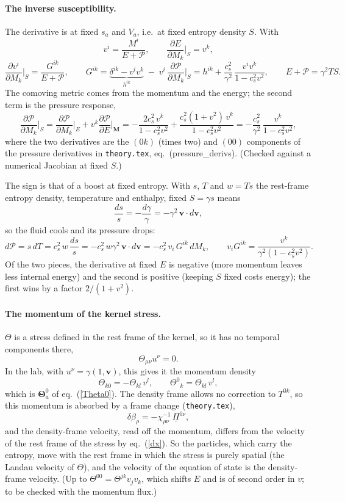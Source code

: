 \documentclass[11pt,aps,preprint,nofootinbib,superscriptaddress,tightenlines]{revtex4-2}
\def\st{\begin{equation}}
\def\stp{\end{equation}}
\def\Eq#1{eq.~(\ref{#1})}
\let\oldparagraph\paragraph
\renewcommand{\paragraph}{\par\bigskip\oldparagraph}
\begin{document}
\paragraph{The inverse susceptibility.}  The derivative is at fixed $s_a$ and $V_a$, i.e.\ at fixed entropy density $S$.  With
\st
v^i=\frac{M^i}{E+\mathcal P},\qquad \frac{\partial E}{\partial M_k}\Big|_S=v^k ,
\stp
\st
\frac{\partial v^i}{\partial M_k}\Big|_S=\frac{G^{ik}}{E+\mathcal P},\qquad
G^{ik}=\underbrace{\delta^{ik}-v^iv^k}_{h^{ik}}\;-\;v^i\,\frac{\partial\mathcal P}{\partial M_k}\Big|_S
=h^{ik}+\frac{c_s^2}{\gamma^2}\,\frac{v^iv^k}{1-c_s^2v^2},\qquad
E+\mathcal P=\gamma^2TS .
\label{G}
\stp
The comoving metric comes from the momentum and the energy; the second term is the pressure response,
\st
\frac{\partial\mathcal P}{\partial M_k}\Big|_S=\frac{\partial\mathcal P}{\partial M_k}\Big|_E+v^k\frac{\partial\mathcal P}{\partial E}\Big|_{\bm M}
=-\frac{2c_s^2\,v^k}{1-c_s^2v^2}+\frac{c_s^2(1+v^2)\,v^k}{1-c_s^2v^2}
=-\frac{c_s^2}{\gamma^2}\,\frac{v^k}{1-c_s^2v^2},
\stp
where the two derivatives are the $(0k)$ (times two) and $(00)$ components of the pressure derivatives in \texttt{theory.tex},
eq.~(pressure\_derivs).  (Checked against a numerical Jacobian at fixed $S$.)

The sign is that of a boost at fixed entropy.  With $s$, $T$ and $w=Ts$ the rest-frame entropy density, temperature and enthalpy, fixed
$S=\gamma s$ means
\st
\frac{ds}{s}=-\frac{d\gamma}{\gamma}=-\gamma^2\,\bm v\cdot d\bm v ,
\stp
so the fluid cools and its pressure drops:
\st
d\mathcal P=s\,dT=c_s^2\,w\,\frac{ds}{s}=-c_s^2\,w\gamma^2\,\bm v\cdot d\bm v=-c_s^2\,v_i\,G^{ik}\,dM_k ,\qquad
v_iG^{ik}=\frac{v^k}{\gamma^2(1-c_s^2v^2)} .
\stp
Of the two pieces, the derivative at fixed $E$ is negative (more momentum leaves less internal energy) and the second is positive
(keeping $S$ fixed costs energy); the first wins by a factor $2/(1+v^2)$.

\paragraph{The momentum of the kernel stress.}  $\Theta$ is a stress defined in the rest frame of the kernel, so it has no temporal
components there,
\st
\Theta_{\mu\nu}u^\nu=0 .
\stp
In the lab, with $u^\nu=\gamma(1,\bm v)$, this gives it the momentum density
\st
\Theta_{k0}=-\Theta_{kl}\,v^l ,\qquad \Theta^0{}_k=\Theta_{kl}\,v^l ,
\stp
which is $\bm\Theta^0_a$ of \Eq{Theta0}.  The density frame allows no correction to $T^{0k}$, so this momentum is absorbed by a frame
change (\texttt{theory.tex}),
\st
\delta\beta_\rho=-\chi^{-1}_{\rho\nu}\,\underline\Pi^{0\nu} ,
\stp
and the density-frame velocity, read off the momentum, differs from the velocity of the rest frame of the stress by \Eq{dx}.  So the
particles, which carry the entropy, move with the rest frame in which the stress is purely spatial (the Landau velocity of $\Theta$),
and the velocity of the equation of state is the density-frame velocity.  (Up to $\Theta^{00}=\Theta^{jk}v_jv_k$, which shifts $E$ and is of
second order in $v$; to be checked with the momentum flux.)
\end{document}
